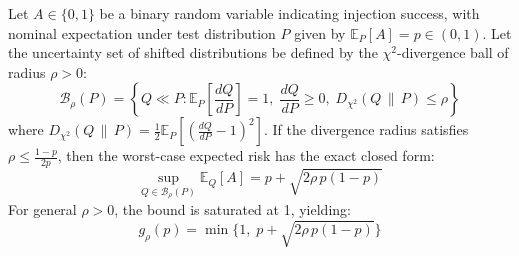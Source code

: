 \begin{theorem}
Let $A \in \{0, 1\}$ be a binary random variable indicating injection success, with nominal expectation under test distribution $P$ given by $\mathbb{E}_P[A] = p \in (0, 1)$. Let the uncertainty set of shifted distributions be defined by the $\chi^2$-divergence ball of radius $\rho > 0$:
\begin{equation}
    \mathcal{B}_\rho(P) = \left\{ Q \ll P : \mathbb{E}_P\left[\frac{dQ}{dP}\right] = 1, \; \frac{dQ}{dP} \ge 0, \; D_{\chi^2}(Q\,\|\,P) \le \rho \right\}
\end{equation}
where $D_{\chi^2}(Q\,\|\,P) = \frac{1}{2} \mathbb{E}_P\left[\left(\frac{dQ}{dP} - 1\right)^2\right]$. If the divergence radius satisfies $\rho \le \frac{1-p}{2p}$, then the worst-case expected risk has the exact closed form:
\begin{equation}
    \sup_{Q \in \mathcal{B}_\rho(P)} \mathbb{E}_Q[A] = p + \sqrt{2\rho\,p(1-p)}
\end{equation}
For general $\rho > 0$, the bound is saturated at 1, yielding:
\begin{equation}
    g_\rho(p) = \min\Big\{1,\; p + \sqrt{2\rho\,p(1-p)}\Big\}
\end{equation}
\end{theorem}

